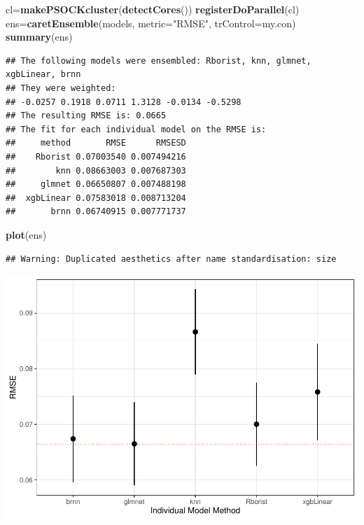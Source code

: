 \documentclass[11pt,]{article}
\newenvironment{Shaded}{\begin{snugshade}}{\end{snugshade}}
\newcommand{\DataTypeTok}[1]{\textcolor[rgb]{0.13,0.29,0.53}{#1}}
\newcommand{\KeywordTok}[1]{\textcolor[rgb]{0.13,0.29,0.53}{\textbf{#1}}}
\newcommand{\NormalTok}[1]{#1}
\newcommand{\StringTok}[1]{\textcolor[rgb]{0.31,0.60,0.02}{#1}}
\begin{document}
\begin{Shaded}
\begin{Highlighting}[]
\NormalTok{cl=}\KeywordTok{makePSOCKcluster}\NormalTok{(}\KeywordTok{detectCores}\NormalTok{())}
\KeywordTok{registerDoParallel}\NormalTok{(cl)}
\NormalTok{ens=}\KeywordTok{caretEnsemble}\NormalTok{(models, }\DataTypeTok{metric=}\StringTok{"RMSE"}\NormalTok{, }\DataTypeTok{trControl=}\NormalTok{my.con)}
\KeywordTok{summary}\NormalTok{(ens)}
\end{Highlighting}
\end{Shaded}

\begin{verbatim}
## The following models were ensembled: Rborist, knn, glmnet, xgbLinear, brnn 
## They were weighted: 
## -0.0257 0.1918 0.0711 1.3128 -0.0134 -0.5298
## The resulting RMSE is: 0.0665
## The fit for each individual model on the RMSE is: 
##     method       RMSE      RMSESD
##    Rborist 0.07003540 0.007494216
##        knn 0.08663003 0.007687303
##     glmnet 0.06650807 0.007488198
##  xgbLinear 0.07583018 0.008713204
##       brnn 0.06740915 0.007771737
\end{verbatim}

\begin{Shaded}
\begin{Highlighting}[]
\KeywordTok{plot}\NormalTok{(ens)}
\end{Highlighting}
\end{Shaded}

\begin{verbatim}
## Warning: Duplicated aesthetics after name standardisation: size
\end{verbatim}

\includegraphics{USGradAdmission_files/figure-latex/unnamed-chunk-16-1.pdf}
\end{document}
